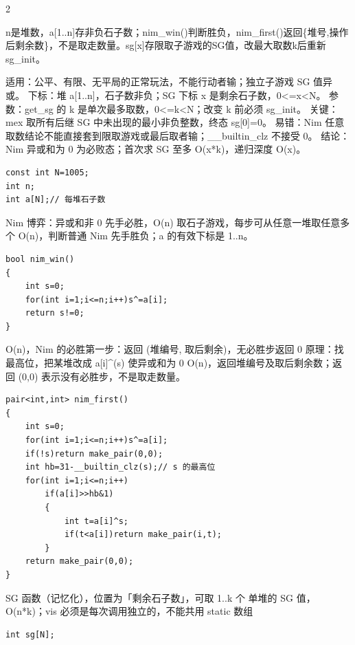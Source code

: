 \documentclass[UTF8,fontset=fandol,a4paper,twoside]{ctexart}
\newcommand{\note}[1]{{\fontsize{10}{12}\selectfont #1\par}}
\begin{document}
\begin{multicols}{2}
\note{n是堆数，a[\allowbreak{}1.\allowbreak{}.\allowbreak{}n]\allowbreak{}存非负石子数；nim\_win(\allowbreak{})\allowbreak{}判断胜负，nim\_first(\allowbreak{})\allowbreak{}返回\{堆号,\allowbreak{}操作后剩余数\}，不是取走数量。sg[\allowbreak{}x]\allowbreak{}存限取子游戏的SG值，改最大取数k后重新sg\_init。}
\note{适用：公平、有限、无平局的正常玩法，不能行动者输；独立子游戏 SG 值异或。 下标：堆 a[\allowbreak{}1.\allowbreak{}.\allowbreak{}n]\allowbreak{}，石子数非负；SG 下标 x 是剩余石子数，0<\allowbreak{}=\allowbreak{}x<\allowbreak{}N。 参数：get\_sg 的 k 是单次最多取数，0<\allowbreak{}=\allowbreak{}k<\allowbreak{}N；改变 k 前必须 sg\_init。 关键：mex 取所有后继 SG 中未出现的最小非负整数，终态 sg[\allowbreak{}0]\allowbreak{}=\allowbreak{}0。 易错：Nim 任意取数结论不能直接套到限取游戏或最后取者输；\_\_builtin\_clz 不接受 0。 结论：Nim 异或和为 0 为必败态；首次求 SG 至多 O(\allowbreak{}x*k)\allowbreak{}，递归深度 O(\allowbreak{}x)\allowbreak{}。}
\begin{lstlisting}
const int N=1005;
int n;
int a[N];// 每堆石子数
\end{lstlisting}
\note{Nim 博弈：异或和非 0 先手必胜，O(\allowbreak{}n)\allowbreak{} 取石子游戏，每步可从任意一堆取任意多个 O(\allowbreak{}n)\allowbreak{}，判断普通 Nim 先手胜负；a 的有效下标是 1.\allowbreak{}.\allowbreak{}n。}
\begin{lstlisting}
bool nim_win()
{
    int s=0;
    for(int i=1;i<=n;i++)s^=a[i];
    return s!=0;
}
\end{lstlisting}
\note{O(\allowbreak{}n)\allowbreak{}，Nim 的必胜第一步：返回 (\allowbreak{}堆编号,\allowbreak{} 取后剩余)\allowbreak{}，无必胜步返回 0 原理：找最高位，把某堆改成 a[\allowbreak{}i]\allowbreak{}\textasciicircum{}(\allowbreak{}s)\allowbreak{} 使异或和为 0 O(\allowbreak{}n)\allowbreak{}，返回堆编号及取后剩余数；返回 (\allowbreak{}0,\allowbreak{}0)\allowbreak{} 表示没有必胜步，不是取走数量。}
\begin{lstlisting}
pair<int,int> nim_first()
{
    int s=0;
    for(int i=1;i<=n;i++)s^=a[i];
    if(!s)return make_pair(0,0);
    int hb=31-__builtin_clz(s);// s 的最高位
    for(int i=1;i<=n;i++)
        if(a[i]>>hb&1)
        {
            int t=a[i]^s;
            if(t<a[i])return make_pair(i,t);
        }
    return make_pair(0,0);
}
\end{lstlisting}
\note{SG 函数（记忆化），位置为「剩余石子数」，可取 1.\allowbreak{}.\allowbreak{}k 个 单堆的 SG 值，O(\allowbreak{}n*k)\allowbreak{}；vis 必须是每次调用独立的，不能共用 static 数组}
\begin{lstlisting}
int sg[N];

\end{lstlisting}
\end{multicols}
\end{document}
